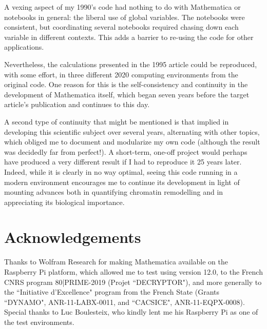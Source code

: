 A vexing aspect of my 1990's code had nothing to do with Mathematica or notebooks in general: the liberal use of global variables. The notebooks were consistent, but coordinating several notebooks required chasing down each variable in different contexts. This adds a barrier to re-using the code for other applications.

Nevertheless, the calculations presented in the 1995 article could be reproduced, with some effort, in three different 2020 computing environments from the original code. One reason for this is the self-consistency and continuity in the development of Mathematica itself, which began seven years before the target article's publication and continues to this day.

A second type of continuity that might be mentioned is that implied in developing this scientific subject over several years, alternating with other topics, which obliged me to document and modularize my own code (although the result was decidedly far from perfect!). A short-term, one-off project would perhaps have produced a very different result if I had to reproduce it 25 years later. Indeed, while it is clearly in no way optimal, seeing this code running in a modern environment encourages me to continue its development in light of mounting advances both in quantifying chromatin remodelling and in appreciating its biological importance.


\section{Acknowledgements}
Thanks to Wolfram Research for making Mathematica available on the Raspberry Pi platform, which allowed me to test using version 12.0, to the French CNRS program 80|PRIME-2019 (Projet ``DECRYPTOR"), and more generally to the ``Initiative d'Excellence" program from  the French State (Grants ``DYNAMO", ANR-11-LABX-0011, and ``CACSICE", ANR-11-EQPX-0008). Special thanks to Luc Boulesteix, who kindly lent me his Raspberry Pi as one of the test environments.

%
